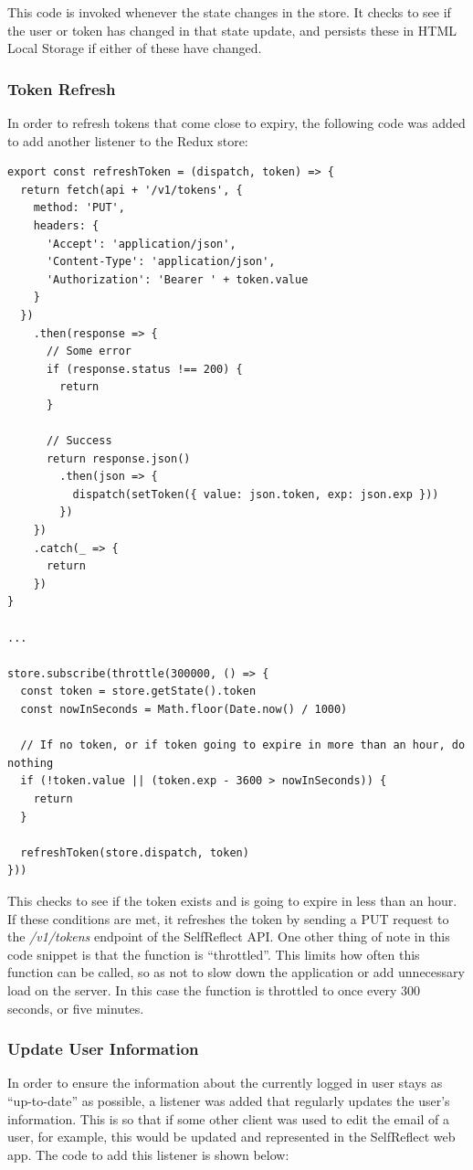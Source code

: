 \documentclass[11pt,openright,a4paper]{report}
\begin{document}
This code is invoked whenever the state changes in the store. It checks to see if the user or token has changed in that state update, and persists these in HTML Local Storage if either of these have changed.

\subsubsection{Token Refresh}
In order to refresh tokens that come close to expiry, the following code was added to add another listener to the Redux store:
\begin{lstlisting}
export const refreshToken = (dispatch, token) => {
  return fetch(api + '/v1/tokens', {
    method: 'PUT',
    headers: {
      'Accept': 'application/json',
      'Content-Type': 'application/json',
      'Authorization': 'Bearer ' + token.value
    }
  })
    .then(response => {
      // Some error
      if (response.status !== 200) {
        return
      }

      // Success
      return response.json()
        .then(json => {
          dispatch(setToken({ value: json.token, exp: json.exp }))
        })
    })
    .catch(_ => {
      return
    })
}

...

store.subscribe(throttle(300000, () => {
  const token = store.getState().token
  const nowInSeconds = Math.floor(Date.now() / 1000)

  // If no token, or if token going to expire in more than an hour, do nothing
  if (!token.value || (token.exp - 3600 > nowInSeconds)) {
    return
  }

  refreshToken(store.dispatch, token)
}))
\end{lstlisting}

This checks to see if the token exists and is going to expire in less than an hour. If these conditions are met, it refreshes the token by sending a PUT request to the \emph{/v1/tokens} endpoint of the SelfReflect API. One other thing of note in this code snippet is that the function is \enquote{throttled}. This limits how often this function can be called, so as not to slow down the application or add unnecessary load on the server. In this case the function is throttled to once every 300 seconds, or five minutes.

\subsubsection{Update User Information}
In order to ensure the information about the currently logged in user stays as \enquote{up-to-date} as possible, a listener was added that regularly updates the user's information. This is so that if some other client was used to edit the email of a user, for example, this would be updated and represented in the SelfReflect web app. The code to add this listener is shown below:
\end{document}
